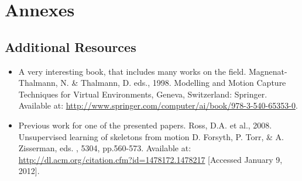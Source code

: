 
\chapter{Annexes} %
\label{cha:annexes}

\section{Additional Resources} %
\label{sec:additional_resources}

\begin{itemize}
	\item A very interesting book, that includes many works on the field. Magnenat-Thalmann, N. \& Thalmann, D. eds., 1998. Modelling and Motion Capture Techniques for Virtual Environments, Geneva, Switzerland: Springer. Available at: \url{http://www.springer.com/computer/ai/book/978-3-540-65353-0}.
	
	\item Previous work for one of the presented papers. Ross, D.A. et al., 2008. Unsupervised learning of skeletons from motion D. Forsyth, P. Torr, \& A. Zisserman, eds. , 5304, pp.560-573. Available at: \url{http://dl.acm.org/citation.cfm?id=1478172.1478217} [Accessed January 9, 2012].
	
\end{itemize}

 
